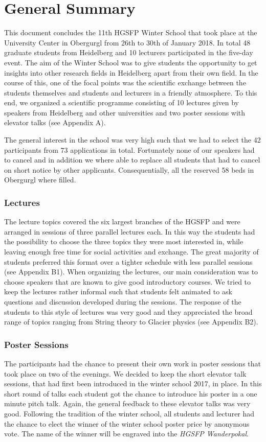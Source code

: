 \section*{General Summary}
This document concludes the 11th HGSFP Winter School that took place at
the University Center in Obergurgl from 26th to 30th of January 2018. In
total 48 graduate students from Heidelberg and 10 lecturers participated
in the five-day event. The aim of the Winter School was to give students
the opportunity to get insights into other research fields in
Heidelberg apart from their own field. In the course of this, one of the
focal points was the scientific exchange between the students
themselves and students and lecturers in a friendly atmosphere. To this
end, we organized a scientific programme consisting of 10 lectures given
by speakers from Heidelberg and other universities and two poster
sessions with elevator talks (see Appendix A).

The general interest in the school was very high such that we had to
select the 42 participants from 73 applications in total.
Fortunately none of our speakers had to cancel and in addition we where
able to replace all students that had to cancel on short notice by other
applicants. Consequentially, all the reserved 58 beds in Obergurgl where
filled.

\subsubsection*{Lectures}
The lecture topics covered the six largest branches of the HGSFP and were
arranged in sessions of three parallel lectures each. In this way the
students had the possibility to choose the three topics they were most
interested in, while leaving enough free time for social activities and
exchange. The great majority of students preferred this format over a
tighter schedule with less parallel sessions (see Appendix B1). When
organizing the lectures, our main consideration was to choose
speakers that are known to give good introductory courses. We tried to
keep the lectures rather informal such that students felt animated to
ask questions and discussion developed during the sessions. The response
of the students to this style of lectures was very good and they
appreciated the broad range of topics ranging from String theory to Glacier
physics (see Appendix B2).

\subsubsection*{Poster Sessions}
The participants had the chance to present their own work in poster
sessions that took place on two of the evenings. We decided to keep
the short elevator talk sessions, that had first been introduced in the
winter school 2017, in place. In this short round of talks each student
got the chance to introduce his poster in a one minute pitch talk.
Again, the general feedback to these elevator talks was very good.
Following the tradition of the winter school, all students and lecturer
had the chance to elect the winner of the winter school poster price by
anonymous vote. The name of the winner will be engraved into the \textit{HGSFP
Wanderpokal}.

